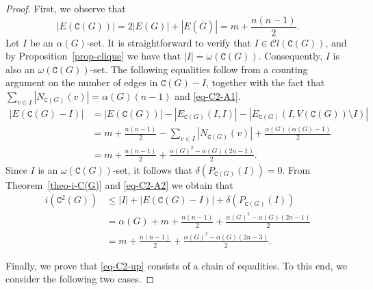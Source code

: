 \documentclass[12pt]{article}
\begin{document}
\begin{proof}
First, we observe that 
\begin{equation}\label{eq-C2-A1}
|E(\mathtt{C}(G))| = 2|E(G)| + |E(\overline{G})| = m + \frac{n(n-1)}{2}.
\end{equation}
Let $I$ be an $\alpha(G)$-set. It is straightforward to verify that $I \in \mathcal{C}l (\mathtt{C}(G))$, and by Proposition~\ref{prop-clique} we have that $|I|=\omega(\mathtt{C}(G))$. Consequently, $I$ is also an $\omega(\mathtt{C}(G))$-set.  The following equalities follow from a counting argument on the number of edges in $\mathtt{C}(G)-I$, together with the fact that $\sum_{v\in I} |N_{\mathtt{C}(G)} (v)| = \alpha(G) (n-1)$ and \eqref{eq-C2-A1}.
\begin{equation}\label{eq-C2-A2}
\begin{split}
|E(\mathtt{C}(G)-I)| &= |E(\mathtt{C}(G))| -  |E_{\mathtt{C}(G)} (I,I)| - |E_{\mathtt{C}(G)} (I, V(\mathtt{C}(G)) \setminus I)| \\[5pt]
&= m + \frac{n(n-1)}{2} - \sum_{v\in I} |N_{\mathtt{C}(G)} (v)| + \frac{\alpha(G)(\alpha(G)-1)}{2} \\[5pt]
&= m + \frac{n(n-1)}{2} + \frac{\alpha(G)^{2} -\alpha(G) (2n-1)}{2}.
\end{split}
\end{equation}
Since $I$ is an $\omega(\mathtt{C}(G))$-set, it follows that $\delta(P_{\mathtt{C}(G)}(I)) = 0$. From Theorem~\ref{theo-i-C(G)} and \eqref{eq-C2-A2} we obtain that
\begin{equation}\label{eq-C2-up}
\begin{split}
i (\mathtt{C}^{2}(G)) &\leq |I| + |E(\mathtt{C}(G)-I)| + \delta(P_{\mathtt{C}(G)}(I)) \\[5pt]
&= \alpha (G) + m + \frac{n(n-1)}{2} + \frac{\alpha(G)^{2} -\alpha(G) (2n-1)}{2}\\[5pt]
&= m + \frac{n(n-1)}{2} + \frac{\alpha(G)^{2} -\alpha(G) (2n-3)}{2}.
\end{split}
\end{equation}

\vspace{.2cm}

\noindent
Finally, we prove that \eqref{eq-C2-up} consists of a chain of equalities. To this end, we consider the following two cases.

\vspace{.2cm}


\end{proof}
\end{document}
